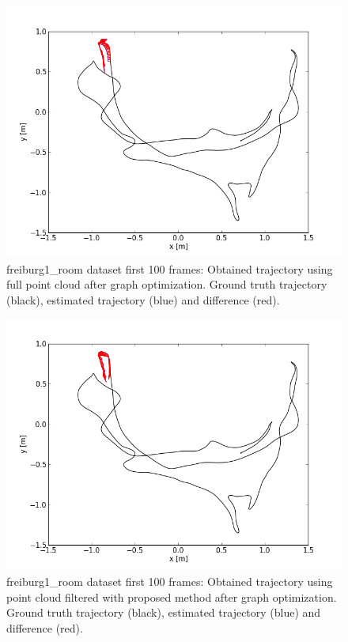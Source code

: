 \begin{figure}[H]
\begin{center}
\includegraphics[scale=0.75]{images/freiburg1_room_1_100_fullcloud_optimized.png}
\caption{freiburg1\_room dataset first 100 frames: Obtained trajectory using full point cloud after graph optimization. Ground truth trajectory (black), estimated trajectory (blue) and difference (red).}
\end{center}
\end{figure}

\begin{figure}[H]
\begin{center}
\includegraphics[scale=0.75]{images/freiburg1_room_1_100_optimized.png}
\caption{freiburg1\_room dataset first 100 frames: Obtained trajectory using point cloud filtered with proposed method after graph optimization. Ground truth trajectory (black), estimated trajectory (blue) and difference (red).}
\end{center}
\end{figure}

